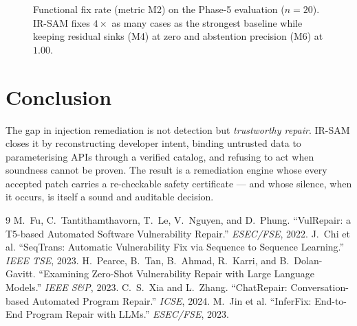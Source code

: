 \documentclass[11pt,a4paper]{article}
\newcommand{\irsam}{\mbox{IR\nobreakdash-SAM}}
\begin{document}
\begin{figure}[t]
\centering
{}
\caption{Functional fix rate (metric M2) on the Phase-5 evaluation
($n=20$). \irsam{} fixes $4\times$ as many cases as the strongest baseline
while keeping residual sinks (M4) at zero and abstention precision (M6)
at $1.00$.}
\label{fig:m2}
\end{figure}

\section*{Conclusion}
The gap in injection remediation is not detection but \emph{trustworthy
repair}. \irsam{} closes it by reconstructing developer intent, binding
untrusted data to parameterising APIs through a verified catalog, and
refusing to act when soundness cannot be proven. The result is a
remediation engine whose every accepted patch carries a re-checkable
safety certificate --- and whose silence, when it occurs, is itself a
sound and auditable decision.


\begin{thebibliography}{9}
 M.~Fu, C.~Tantithamthavorn, T.~Le, V.~Nguyen,
  and D.~Phung. ``VulRepair: a T5-based Automated Software Vulnerability
  Repair.'' \emph{ESEC/FSE}, 2022.
 J.~Chi et al. ``SeqTrans: Automatic
  Vulnerability Fix via Sequence to Sequence Learning.'' \emph{IEEE TSE},
  2023.
 H.~Pearce, B.~Tan, B.~Ahmad, R.~Karri, and
  B.~Dolan-Gavitt. ``Examining Zero-Shot Vulnerability Repair with Large
  Language Models.'' \emph{IEEE S\&P}, 2023.
 C.~S.~Xia and L.~Zhang. ``ChatRepair:
  Conversation-based Automated Program Repair.'' \emph{ICSE}, 2024.
 M.~Jin et al. ``InferFix: End-to-End Program
  Repair with LLMs.'' \emph{ESEC/FSE}, 2023.
\end{thebibliography}
\end{document}
